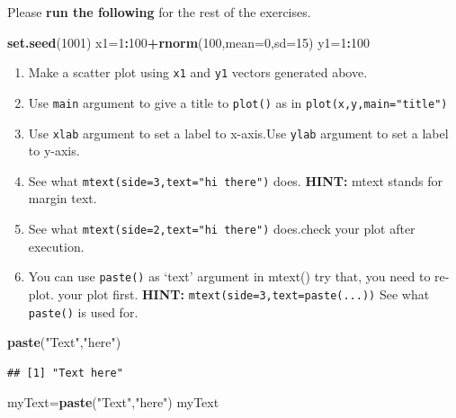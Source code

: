 \documentclass[12pt,]{krantz}
\newenvironment{Shaded}{\begin{snugshade}}{\end{snugshade}}
\newcommand{\DataTypeTok}[1]{\textcolor[rgb]{0.13,0.29,0.53}{#1}}
\newcommand{\DecValTok}[1]{\textcolor[rgb]{0.00,0.00,0.81}{#1}}
\newcommand{\KeywordTok}[1]{\textcolor[rgb]{0.13,0.29,0.53}{\textbf{#1}}}
\newcommand{\NormalTok}[1]{#1}
\newcommand{\OperatorTok}[1]{\textcolor[rgb]{0.81,0.36,0.00}{\textbf{#1}}}
\newcommand{\StringTok}[1]{\textcolor[rgb]{0.31,0.60,0.02}{#1}}
\theoremstyle{definition}
\theoremstyle{definition}
\theoremstyle{definition}
\theoremstyle{remark}
\begin{document}
Please \textbf{run the following} for the rest of the exercises.

\begin{Shaded}
\begin{Highlighting}[]
\KeywordTok{set.seed}\NormalTok{(}\DecValTok{1001}\NormalTok{)}
\NormalTok{x1=}\DecValTok{1}\OperatorTok{:}\DecValTok{100}\OperatorTok{+}\KeywordTok{rnorm}\NormalTok{(}\DecValTok{100}\NormalTok{,}\DataTypeTok{mean=}\DecValTok{0}\NormalTok{,}\DataTypeTok{sd=}\DecValTok{15}\NormalTok{)}
\NormalTok{y1=}\DecValTok{1}\OperatorTok{:}\DecValTok{100}
\end{Highlighting}
\end{Shaded}

\begin{enumerate}
\def\labelenumi{\arabic{enumi}.}
\setcounter{enumi}{43}
\item
  Make a scatter plot using \texttt{x1} and \texttt{y1} vectors
  generated above.
\item
  Use \texttt{main} argument to give a title to \texttt{plot()} as in
  \texttt{plot(x,y,main="title")}
\item
  Use \texttt{xlab} argument to set a label to x-axis.Use \texttt{ylab}
  argument to set a label to y-axis.
\item
  See what \texttt{mtext(side=3,text="hi\ there")} does. \textbf{HINT:}
  mtext stands for margin text.
\item
  See what \texttt{mtext(side=2,text="hi\ there")} does.check your plot
  after execution.
\item
  You can use \texttt{paste()} as `text' argument in mtext() try that,
  you need to re-plot. your plot first. \textbf{HINT:}
  \texttt{mtext(side=3,text=paste(...))} See what \texttt{paste()} is
  used for.
\end{enumerate}

\begin{Shaded}
\begin{Highlighting}[]
\KeywordTok{paste}\NormalTok{(}\StringTok{"Text"}\NormalTok{,}\StringTok{"here"}\NormalTok{)}
\end{Highlighting}
\end{Shaded}

\begin{verbatim}
## [1] "Text here"
\end{verbatim}

\begin{Shaded}
\begin{Highlighting}[]
\NormalTok{myText=}\KeywordTok{paste}\NormalTok{(}\StringTok{"Text"}\NormalTok{,}\StringTok{"here"}\NormalTok{)}
\NormalTok{myText}
\end{Highlighting}
\end{Shaded}
\end{document}
